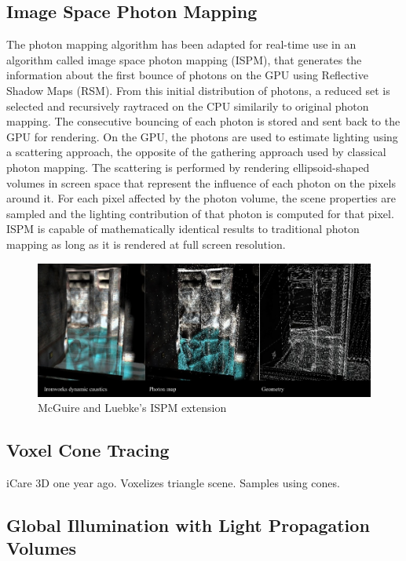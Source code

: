 	\subsection {Image Space Photon Mapping}
		The photon mapping algorithm has been adapted for real-time use in an algorithm called image space photon mapping (ISPM), that generates the information about the first bounce of photons on the GPU using Reflective Shadow Maps (RSM). \cite{dachsbacher2005} 
		From this initial distribution of photons, a reduced set is selected and recursively raytraced on the CPU similarily to original photon mapping. The consecutive bouncing of each photon is stored and sent back to the GPU for rendering. On the GPU, the photons are used to estimate lighting using a scattering approach, the opposite of the gathering approach used by classical photon mapping. The scattering is performed by rendering ellipsoid-shaped volumes in screen space that represent the influence of each photon on the pixels around it. For each pixel affected by the photon volume, the scene properties are sampled and the lighting contribution of that photon is computed for that pixel. ISPM is capable of mathematically identical results to traditional photon mapping as long as it is rendered at full screen resolution.

		\begin{figure}
			\centering
				\includegraphics[width=1.00\textwidth]{previous_work/ispm.jpg}
			\caption{McGuire and Luebke's ISPM extension}
			\label{fig:ispm}
		\end{figure}
	
	\subsection {Voxel Cone Tracing}
		iCare 3D one year ago. Voxelizes triangle scene. Samples using cones. \cite{crassin2011}

	\subsection {Global Illumination with Light Propagation Volumes}

